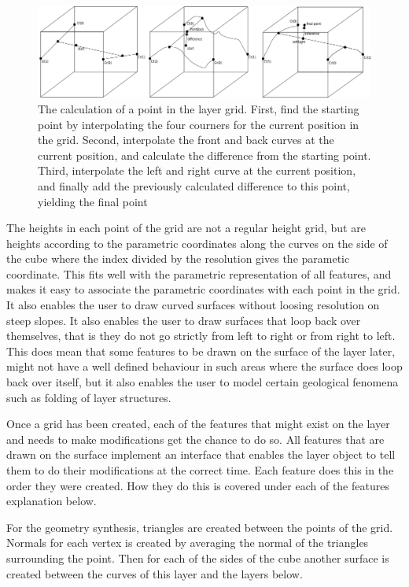 \documentclass[a4paper,12pt]{report}
\begin{document}
\begin{figure}
 \label{fig:layerCreation}
 \includegraphics[width=\linewidth]{thesis/layerCreation.pdf}
 \caption{The calculation of a point in the layer grid. First, find the starting point by interpolating the four courners for the current position in the grid. Second, interpolate the front and back curves at the current position, and calculate the difference from the starting point. Third, interpolate the left and right curve at the current position, and finally add the previously calculated difference to this point, yielding the final point}
\end{figure}



The heights in each point of the grid are not a regular height grid, but are heights according to the parametric coordinates along the curves on the side of the cube where the index divided by the resolution gives the parametic coordinate. This fits well with the parametric representation of all features, and makes it easy to associate the parametric coordinates with each point in the grid. It also enables the user to draw curved surfaces without loosing resolution on steep slopes. It also enables the user to draw surfaces that loop back over themselves, that is they do not go strictly from left to right or from right to left. This does mean that some features to be drawn on the surface of the layer later, might not have a well defined behaviour in such areas where the surface does loop back over itself, but it also enables the user to model certain geological fenomena such as folding of layer structures.

Once a grid has been created, each of the features that might exist on the layer and needs to make modifications get the chance to do so. All features that are drawn on the surface implement an interface that enables the layer object to tell them to do their modifications at the correct time. Each feature does this in the order they were created. How they do this is covered under each of the features explanation below.

For the geometry synthesis, triangles are created between the points of the grid. Normals for each vertex is created by averaging the normal of the triangles surrounding the point. Then for each of the sides of the cube another surface is created between the curves of this layer and the layers below.
\end{document}
